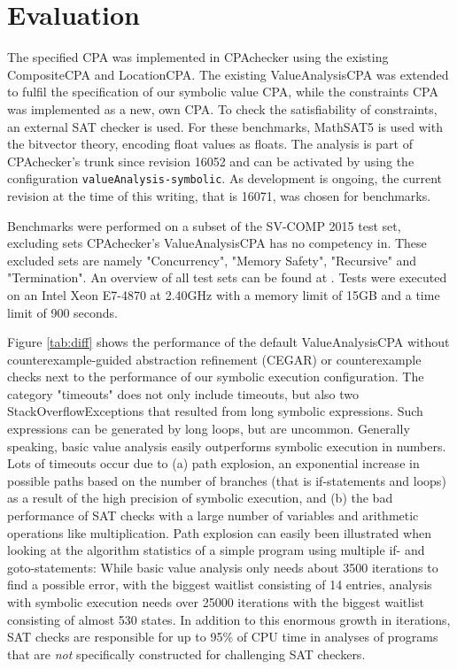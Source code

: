 \section{Evaluation}
The specified CPA was implemented in CPAchecker\cite{Beyer2011} using the existing CompositeCPA and LocationCPA.
The existing ValueAnalysisCPA  was extended to fulfil the specification of our symbolic value CPA,
while the constraints CPA was implemented as a new, own CPA. To check the satisfiability of constraints, an external SAT checker is used. For these benchmarks, MathSAT5 is used with the bitvector theory, encoding float values as floats.
The analysis is part of CPAchecker's trunk since revision 16052 and can be activated by using the configuration \texttt{valueAnalysis-symbolic}. As development is ongoing, the current revision at the time of this writing, that is 16071, was chosen for benchmarks.

Benchmarks were performed on a subset of the SV-COMP 2015 test set, excluding sets CPAchecker's ValueAnalysisCPA has no competency in.
These excluded sets are namely "Concurrency", "Memory Safety", "Recursive" and "Termination". An overview of all test sets can be found at \cite{SV15Benchmark}.
Tests were executed on an Intel Xeon E7-4870 at 2.40GHz with a memory limit of 15GB and a time limit of 900 seconds.

Figure \ref{tab:diff} shows the performance of the default ValueAnalysisCPA without counterexample-guided abstraction refinement (CEGAR) or counterexample checks next to the performance of our symbolic execution configuration. The category "timeouts" does not only include timeouts, but also two StackOverflowExceptions that resulted from long symbolic expressions. Such expressions can be generated by long loops, but are uncommon.
Generally speaking, basic value analysis easily outperforms symbolic execution in numbers.
Lots of timeouts occur due to
(a) path explosion, an exponential increase in possible paths based on the number of branches (that is if-statements and loops) as a result of the high precision of symbolic execution, and
(b) the bad performance of SAT checks with a large number of variables and arithmetic operations like multiplication.
Path explosion can easily been illustrated when looking at the algorithm statistics of a simple program using multiple if- and goto-statements:
While basic value analysis only needs about 3500 iterations to find a possible error, with the biggest waitlist consisting of 14 entries,
analysis with symbolic execution needs over 25000 iterations with the biggest waitlist consisting of almost 530 states.
In addition to this enormous growth in iterations, SAT checks are responsible for up to 95\% of CPU time in analyses of programs that are \emph{not} specifically constructed for challenging SAT checkers.

